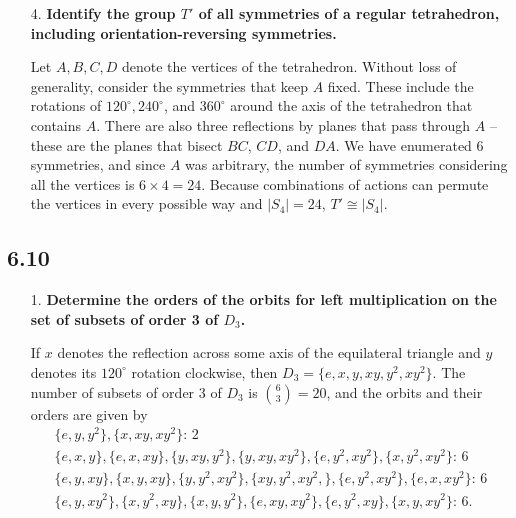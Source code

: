 \documentclass[a4paper,12pt]{article}
\begin{document}
\begin{enumerate}
    \item[4.]
        \boldmath
        \textbf{Identify the group $T'$ of all symmetries of a regular tetrahedron, including orientation-reversing symmetries.} \par
        \unboldmath
        Let $A, B, C, D$ denote the vertices of the tetrahedron. Without loss of generality, consider the symmetries that keep $A$ fixed. These include the rotations of $120^\circ, 240^\circ$, and $360^\circ$ around the axis of the tetrahedron that contains $A$. There are also three reflections by planes that pass through $A$ -- these are the planes that bisect $BC$, $CD$, and $DA$. We have enumerated 6 symmetries, and since $A$ was arbitrary, the number of symmetries considering all the vertices is $6 \times 4 = 24$. Because combinations of actions can permute the vertices in every possible way and $|S_4| = 24$, $T' \cong |S_4|$.
\end{enumerate}

\subsection*{6.10}
\begin{enumerate}
    \item[1.]
        \boldmath
        \textbf{Determine the orders of the orbits for left multiplication on the set of subsets of order 3 of $D_3$.} \par
        \unboldmath
        If $x$ denotes the reflection across some axis of the equilateral triangle and $y$ denotes its $120^\circ$ rotation clockwise, then $D_3 = \{ e, x, y, xy, y^2, xy^2 \}$. The number of subsets of order $3$ of $D_3$ is $\binom{6}{3} = 20$, and the orbits and their orders are given by
        \begin{gather*}
            \{ e, y, y^2 \}, \{ x, xy, xy^2 \} \text{: 2} \\
            \{ e, x, y \}, \{ e, x, xy \}, \{ y, xy, y^2 \}, \{ y, xy, xy^2 \}, \{ e, y^2, xy^2 \}, \{ x, y^2, xy^2 \} \text{: 6} \\
            \{ e, y, xy \}, \{ x, y, xy \}, \{ y, y^2, xy^2 \}, \{ xy, y^2, xy^2, \}, \{ e, y^2, xy^2 \}, \{ e, x, xy^2 \} \text{: 6} \\
            \{ e, y, xy^2 \}, \{ x, y^2, xy \}, \{ x, y, y^2 \}, \{ e, xy, xy^2 \}, \{ e, y^2, xy \}, \{ x, y, xy^2 \} \text{: 6}.
        \end{gather*}
\end{enumerate}
\end{document}

